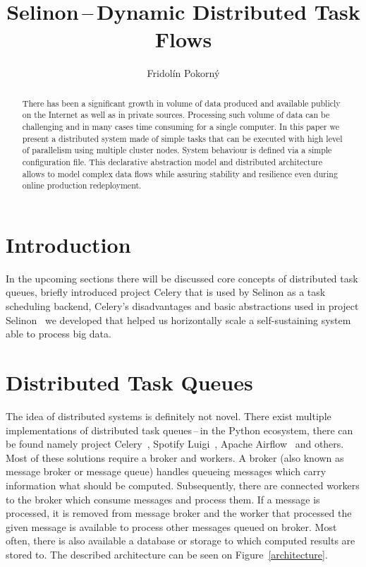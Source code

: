 \documentclass[a4paper]{llncs}
\begin{document}
%
\title{Selinon\,--\,Dynamic Distributed Task Flows}
%
%
\author{Fridol\'in Pokorn\'y}


\maketitle
\begin{abstract}
There has been a significant growth in volume of data produced and available publicly on the Internet as well as in private sources. Processing such volume of data can be challenging and in many cases time consuming for a single computer. In this paper we present a distributed system made of simple tasks that can be executed with high level of parallelism using multiple cluster nodes. System behaviour is defined via a simple configuration file. This declarative abstraction model and distributed architecture allows to model complex data flows while assuring stability and resilience even during online production redeployment.
\end{abstract}

\section{Introduction}

In the upcoming sections there will be discussed core concepts of distributed task queues, briefly introduced project Celery that is used by Selinon as a task scheduling backend, Celery's disadvantages and basic abstractions used in project Selinon~\cite{ref_selinon_homepage,ref_selinon_github} we developed that helped us horizontally scale a self-sustaining system able to process big data.

\section{Distributed Task Queues} \label{section_distributed_task_queues}

The idea of distributed systems is definitely not novel. There exist multiple implementations of distributed task queues\,--\,in the Python ecosystem, there can be found namely project Celery~\cite{ref_celery}, Spotify Luigi~\cite{ref_luigi}, Apache Airflow~\cite{ref_airflow} and others. Most of these solutions require a broker and workers. A broker (also known as message broker or message queue) handles queueing messages which carry information what should be computed. Subsequently, there are connected workers to the broker which consume messages and process them. If a message is processed, it is removed from message broker and the worker that processed the given message is available to process other messages queued on broker. Most often, there is also available a database or storage to which computed results are stored to. The described architecture can be seen on Figure~\ref{architecture}.
\end{document}
